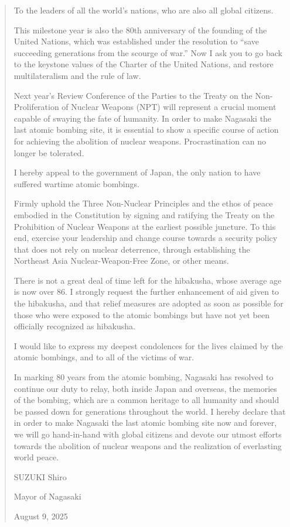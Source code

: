\begin{quote}
To the leaders of all the world’s nations, who are also all global citizens.

This milestone year is also the 80th anniversary of the founding of the United Nations, which was established under the resolution to “save succeeding generations from the scourge of war.” Now I ask you to go back to the keystone values of the Charter of the United Nations, and restore multilateralism and the rule of law.

Next year’s Review Conference of the Parties to the Treaty on the Non-Proliferation of Nuclear Weapons (NPT) will represent a crucial moment capable of swaying the fate of humanity. In order to make Nagasaki the last atomic bombing site, it is essential to show a specific course of action for achieving the abolition of nuclear weapons. Procrastination can no longer be tolerated.

I hereby appeal to the government of Japan, the only nation to have suffered wartime atomic bombings.

Firmly uphold the Three Non-Nuclear Principles and the ethos of peace embodied in the Constitution by signing and ratifying the Treaty on the Prohibition of Nuclear Weapons at the earliest possible juncture. To this end, exercise your leadership and change course towards a security policy that does not rely on nuclear deterrence, through establishing the Northeast Asia Nuclear-Weapon-Free Zone, or other means.

There is not a great deal of time left for the hibakusha, whose average age is now over 86. I strongly request the further enhancement of aid given to the hibakusha, and that relief measures are adopted as soon as possible for those who were exposed to the atomic bombings but have not yet been officially recognized as hibakusha.

I would like to express my deepest condolences for the lives claimed by the atomic bombings, and to all of the victims of war.

In marking 80 years from the atomic bombing, Nagasaki has resolved to continue our duty to relay, both inside Japan and overseas, the memories of the bombing, which are a common heritage to all humanity and should be passed down for generations throughout the world. I hereby declare that in order to make Nagasaki the last atomic bombing site now and forever, we will go hand-in-hand with global citizens and devote our utmost efforts towards the abolition of nuclear weapons and the realization of everlasting world peace.

SUZUKI Shiro

Mayor of Nagasaki

August 9, 2025
\end{quote}

